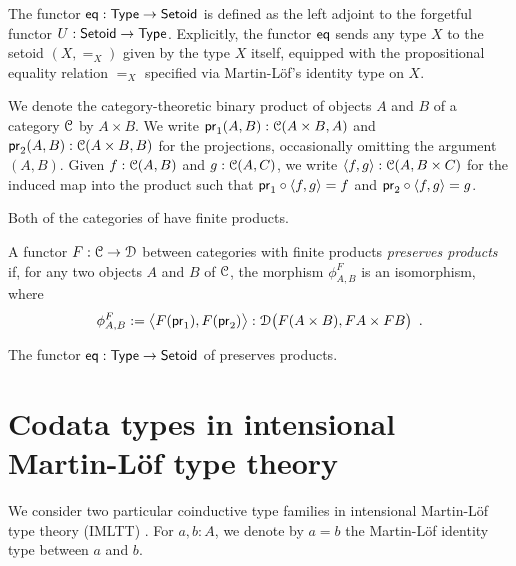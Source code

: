 \documentclass[a4paper,USenglish]{lipics}
\begin{document}
\begin{defn}
\label{def:eq}
 The functor $\eq : \Set\to\Setoid$ is defined as the left adjoint to the forgetful functor $U : \Setoid \to \Set$.
  Explicitly, the functor $\eq$ sends any type $X$ to the setoid $(X,=_X)$ given by the type $X$ itself, equipped
  with the propositional equality relation $=_X$ specified via Martin-L\"of's identity type on $X$.
\end{defn}


\begin{rem}
  We denote the category-theoretic binary product of objects $A$ and $B$ of a category $\C$ by $A\times B$.
  We write $\pr_1(A,B) : \C(A\times B, A)$ and $\pr_2(A,B) :\C(A\times B, B)$ for the projections, occasionally omitting the 
  argument $(A,B)$.
  Given $f : \C(A, B)$ and $g : \C(A,C)$, we write $\langle f,g\rangle : \C(A,B\times C)$ for the induced map into the product such that
  $\comp{\langle f,g\rangle}{\pr_1} = f$ and $\comp{\langle f,g\rangle}{\pr_2} = g$.
\end{rem}

Both of the categories of  have finite products.

\begin{defn}
\label{def:monoidal_functor}
 A functor $F:\C\to\D$ between categories with finite products \emph{preserves products} if, for any two objects $A$ and $B$ of $\C$,
  the morphism $\phi^F_{A,B}$ is an isomorphism, where
 \[ \phi^F_{A,B} := \bigl\langle F(\pr_1), F(\pr_2) \bigr\rangle : \D\bigl(F(A\times B), FA\times FB\bigr)\enspace . \] 
\end{defn}

\begin{ex}
  The functor $\eq: \Set \to \Setoid$ of  preserves products.
\end{ex}


\section{Codata types in intensional Martin-L\"of type theory}\label{sec:tri}

We consider two particular coinductive type families in intensional Martin-L\"of type theory (IMLTT) \parencite{martin_lof}.
For $a,b : A$, we denote by $a = b$ the Martin-L\"of identity type between $a$ and $b$.
\end{document}
